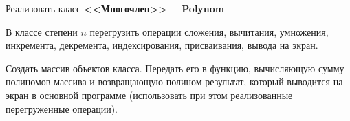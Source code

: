 Реализовать класс \textbf{<<Многочлен>>~-- Polynom}

В классе степени $n$ перегрузить операции сложения, вычитания,
умножения, инкремента, декремента, индексирования, присваивания, вывода на экран.

Создать массив объектов класса. Передать его в функцию, вычисляющую сумму
полиномов массива и возвращающую полином-результат, который выводится на экран в
основной программе (использовать при этом реализованные перегруженные операции).
